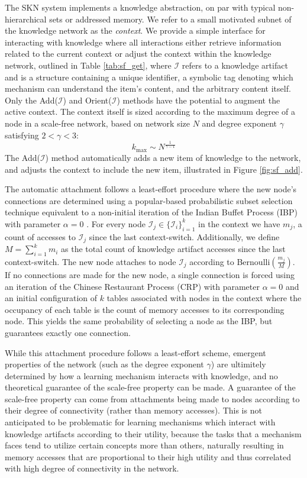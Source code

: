 \documentclass[11pt,letterpaper]{article}
\begin{document}
The SKN system implements a knowledge abstraction, on par with typical
non-hierarchical sets or addressed memory. We refer to a small motivated
subnet of the knowledge network as the {\em context}. We provide a simple
interface for interacting with knowledge where all interactions either
retrieve information related to the current context or adjust the context
within the knowledge network, outlined in Table \ref{tab:sf_get}, where
$\mathcal{I}$ refers to a knowledge artifact and is a structure containing a
unique identifier, a symbolic tag denoting which mechanism can understand
the item's content, and the arbitrary content itself. Only the {\sc
Add($\mathcal{I}$)} and {\sc Orient($\mathcal{I}$)} methods have the
potential to augment the active context. The context itself is sized
according to the maximum degree of a node in a scale-free network, based on
network size $N$ and degree exponent $\gamma$ satisfying $2<\gamma<3$:
\[k_{\text{max}} \sim N^{\frac1{\gamma-1}}\] The {\sc Add($\mathcal{I}$)}
method automatically adds a new item of knowledge to the network, and
adjusts the context to include the new item, illustrated in Figure
\ref{fig:sf_add}.

The automatic attachment follows a least-effort procedure where the new
node's connections are determined using a popular-based probabilistic subset
selection technique equivalent to a non-initial iteration of the Indian
Buffet Process (IBP) with parameter $\alpha=0$ \cite{griffiths11}. For every
node $\mathcal{I}_j\in\{\mathcal{I}_i\}_{i=1}^k$ in the context we have
$m_j$, a count of accesses to $\mathcal{I}_j$ since the last context-switch.
Additionally, we define $M=\sum_{i=1}^km_i$ as the total count of knowledge
artifact accesses since the last context-switch. The new node attaches to
node $\mathcal{I}_j$ according to Bernoulli$\left(\frac{m_j}{M}\right)$.
If no connections are made for the new node, a single connection is forced
using an iteration of the Chinese Restaurant Process (CRP) with parameter
$\alpha=0$ and an initial configuration of $k$ tables associated with nodes
in the context where the occupancy of each table is the count of memory
accesses to its corresponding node. This yields the same probability of
selecting a node as the IBP, but guarantees exactly one connection.

While this attachment procedure follows a least-effort scheme, emergent
properties of the network (such as the degree exponent $\gamma$) are
ultimitely determined by how a learning mechanism interacts with knowledge,
and no theoretical guarantee of the scale-free property can be made. A
guarantee of the scale-free property can come from attachments being made to
nodes according to their degree of connectivity (rather than memory
accesses). This is not anticipated to be problematic for learning mechanisms
which interact with knowledge artifacts according to their utility, because
the tasks that a mechanism faces tend to utilize certain concepts more than
others, naturally resulting in memory accesses that are proportional to
their high utility and thus correlated with high degree of connectivity in
the network.
\end{document}
